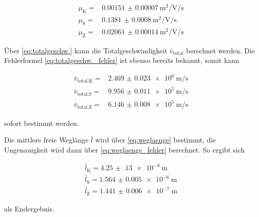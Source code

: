 \begin{align*}
    \mu _\text{K} =& \SI{0.00151(7)}{\meter\squared\per\volt\per\second}\\
    \mu _\text{S} =& \SI{0.1381(8)}{\meter\squared\per\volt\per\second}\\
    \mu _\text{Z} =& \SI{0.02061(14)}{\meter\squared\per\volt\per\second}
\end{align*}

Über \autoref{eq:totalgeschw.} kann die Totalgeschwindigkeit $\bar{v}_\text{total}$ berechnet werden.
Die Fehlerformel \autoref{eq:totalgeschw._fehler} ist ebenso bereits bekannt, somit kann 

\begin{align*}
    \bar{v}_\text{total,K} =& \SI{2.469(23)e6}{\meter\per\second}\\
    \bar{v}_\text{total,S} =& \SI{9.956(11)e5}{\meter\per\second}\\
    \bar{v}_\text{total,Z} =& \SI{6.146(8)e5}{\meter\per\second}
\end{align*}

sofort bestimmt werden.

Die mittlere freie Weglänge $\bar{l}$ wird über \autoref{eq:weglaenge} bestimmt, die Ungenauigkeit wird dann über \autoref{eq:weglaenge_fehler} berechnet.
So ergibt sich

\begin{align*}
    \bar{l}_\text{K} = \SI{4.25(13)e-8}{\meter}\\
    \bar{l}_\text{S} = \SI{1.564(5)e-6}{\meter}\\
    \bar{l}_\text{Z} = \SI{1.441(6)e-7}{\meter}
\end{align*}

als Endergebnis.